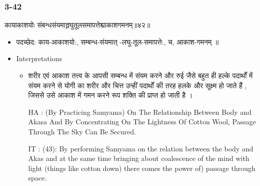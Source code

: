 \begin{frame}[fragile]\frametitle{3-42}
\begin{sanskrit}
कायाकाशयोः संबन्धसंयमाल्लघुतूलसमापत्तेश्चाकाशगमनम्॥४२॥
\end{sanskrit}

	\begin{itemize}
	\item पदच्छेद:  काय-आकाशयो:, सम्बन्ध-‌संयमात् -लघु-तूल-समापत्ते:, च, आकाश-गमनम् ॥
	\item Interpretations
		\begin{itemize}	
		\item शरीर एवं आकाश तत्त्व के आपसी सम्बन्ध में संयम करने और रुई जैसे बहुत ही हल्के पदार्थों में संयम करने से योगी का शरीर और चित्त उन्हीं पदार्थों की तरह हलके और सूक्ष्म हो जाते हैं , जिससे उसे आकाश में गमन करने  रूप शक्ति की प्राप्त हो जाती है ।
		\item [HA]: (By Practicing Samyama) On The Relationship Between Body and Akasa And By Concentrating On The Lightness Of Cotton Wool, Passage Through The Sky Can Be Secured.
		\item [IT]: (43): By performing Samyama on the relation between the body and Akas and at the same time bringing about coalescence of the mind with light (things like cotton down) there comes the power of) passage through space.
		\end{itemize}
	\end{itemize}
\end{frame}

